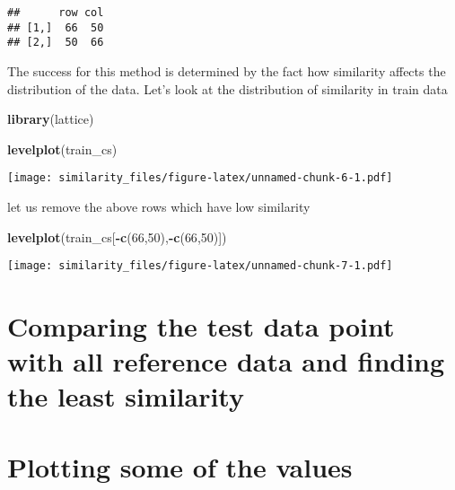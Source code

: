 \documentclass[]{article}
\newenvironment{Shaded}{\begin{snugshade}}{\end{snugshade}}
\newcommand{\KeywordTok}[1]{\textcolor[rgb]{0.13,0.29,0.53}{\textbf{#1}}}
\newcommand{\DecValTok}[1]{\textcolor[rgb]{0.00,0.00,0.81}{#1}}
\newcommand{\OperatorTok}[1]{\textcolor[rgb]{0.81,0.36,0.00}{\textbf{#1}}}
\newcommand{\NormalTok}[1]{#1}
\begin{document}
\begin{verbatim}
##      row col
## [1,]  66  50
## [2,]  50  66
\end{verbatim}

The success for this method is determined by the fact how similarity
affects the distribution of the data. Let's look at the distribution of
similarity in train data

\begin{Shaded}
\begin{Highlighting}[]
\KeywordTok{library}\NormalTok{(lattice)}

\KeywordTok{levelplot}\NormalTok{(train_cs)}
\end{Highlighting}
\end{Shaded}

\texttt{[image: similarity\_files/figure-latex/unnamed-chunk-6-1.pdf]}

let us remove the above rows which have low similarity

\begin{Shaded}
\begin{Highlighting}[]
\KeywordTok{levelplot}\NormalTok{(train_cs[}\OperatorTok{-}\KeywordTok{c}\NormalTok{(}\DecValTok{66}\NormalTok{,}\DecValTok{50}\NormalTok{),}\OperatorTok{-}\KeywordTok{c}\NormalTok{(}\DecValTok{66}\NormalTok{,}\DecValTok{50}\NormalTok{)])}
\end{Highlighting}
\end{Shaded}

\texttt{[image: similarity\_files/figure-latex/unnamed-chunk-7-1.pdf]}

\section{Comparing the test data point with all reference data and
finding the least
similarity}\label{comparing-the-test-data-point-with-all-reference-data-and-finding-the-least-similarity}

\section{Plotting some of the values}\label{plotting-some-of-the-values}
\end{document}
